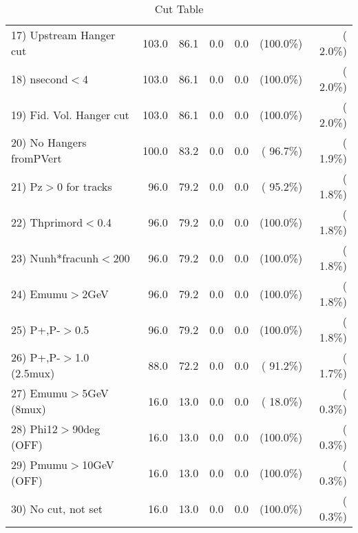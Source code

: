\begin{table}[h!]
\begin{tabular}{||l||r|r|r|r|r|r||}
 17) Upstream Hanger cut  &        103.0 &         86.1 &          0.0 &          0.0 & (100.0\%) & (  2.0\%) \\
 18) nsecond$<$4          &        103.0 &         86.1 &          0.0 &          0.0 & (100.0\%) & (  2.0\%) \\
 19) Fid. Vol. Hanger cut &        103.0 &         86.1 &          0.0 &          0.0 & (100.0\%) & (  2.0\%) \\
 20) No Hangers fromPVert &        100.0 &         83.2 &          0.0 &          0.0 & ( 96.7\%) & (  1.9\%) \\
 21) Pz$>$0 for tracks    &         96.0 &         79.2 &          0.0 &          0.0 & ( 95.2\%) & (  1.8\%) \\
 22) Thprimord$<$0.4      &         96.0 &         79.2 &          0.0 &          0.0 & (100.0\%) & (  1.8\%) \\
 23) Nunh*fracunh$<$200   &         96.0 &         79.2 &          0.0 &          0.0 & (100.0\%) & (  1.8\%) \\
 24) Emumu$>$2GeV         &         96.0 &         79.2 &          0.0 &          0.0 & (100.0\%) & (  1.8\%) \\
 25) P+,P-$>$0.5          &         96.0 &         79.2 &          0.0 &          0.0 & (100.0\%) & (  1.8\%) \\
 26) P+,P-$>$1.0 (2.5mux) &         88.0 &         72.2 &          0.0 &          0.0 & ( 91.2\%) & (  1.7\%) \\
 27) Emumu$>$5GeV  (8mux) &         16.0 &         13.0 &          0.0 &          0.0 & ( 18.0\%) & (  0.3\%) \\
 28) Phi12$>$90deg  (OFF) &         16.0 &         13.0 &          0.0 &          0.0 & (100.0\%) & (  0.3\%) \\
 29) Pmumu$>$10GeV  (OFF) &         16.0 &         13.0 &          0.0 &          0.0 & (100.0\%) & (  0.3\%) \\
 30) No cut, not set      &         16.0 &         13.0 &          0.0 &          0.0 & (100.0\%) & (  0.3\%) \\
 \hline
 \hline
 \end{tabular}
 \caption{Cut Table           }
 \label{tab-cutcohjpsi-mumu_jpsi}
 \end{table}
